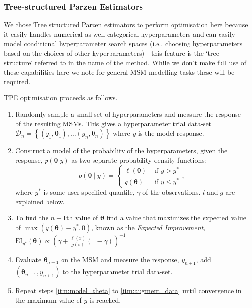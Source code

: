 \documentclass[journal=jacsat,manuscript=article]{achemso}
\begin{document}
\subsubsection{Tree-structured Parzen Estimators}
We chose Tree structured Parzen estimators to perform optimisation here because it easily handles numerical as well categorical hyperparameters and can easily model conditional hyperparameter search spaces (i.e., choosing hyperparameters based on the choices of other hyperparameters) - this feature is the `tree-structure' referred to in the name of the method. While we don't make full use of these capabilities here we note for general MSM modelling tasks these will be required. 

TPE optimisation proceeds as follows. 
\begin{enumerate}
    \item Randomly sample a small set of hyperparameters and measure the response of the resulting MSMs. This gives a hyperparameter trial data-set $\mathcal{D}_{n}=\left\{(y_1, \bm{\theta}_1),  \ldots (y_n, \bm{\theta}_n) \right \}$ where $y$ is the model response.
    \item Construct a model of the probability of the hyperparameters, given the response, $p(\bm{\theta}|y)$ as two separate probability density functions: 
    \begin{equation}
        p(\bm{\theta} \mid y)= \begin{cases}\ell(\bm{\theta}) & \text { if } y>y^* \\ g(\bm{\theta}) & \text { if } y \leq y^*\end{cases}, 
    \end{equation}
    where $y^{*}$ is some user specified quantile, $\gamma$ of the observations.  $l$ and $g$ are explained below.\label{itm:model_theta} 
    \item To find the $n+1$th value of $\bm{\theta}$ find a value that  maximizes the expected value of $\max{(y(\bm{\theta})-y^{*}, 0)}$, known as the \emph{Expected Improvement}, $\mathrm{EI}_{y^{*}}(\bm{\theta})\propto\left(\gamma+\frac{\ell(x)}{g(x)}(1-\gamma)\right)^{-1}$
    \item Evaluate $\bm{\theta}_{n+1}$ on the MSM and measure the response, $y_{n+1}$, add $\left( \bm{\theta}_{n+1}, y_{n+1}\right)$ to the hyperparameter trial data-set. \label{itm:augment_data}
    \item Repeat steps \ref{itm:model_theta} to \ref{itm:augment_data} until convergence in the maximum value of $y$ is reached.   
    
\end{enumerate}
\end{document}

